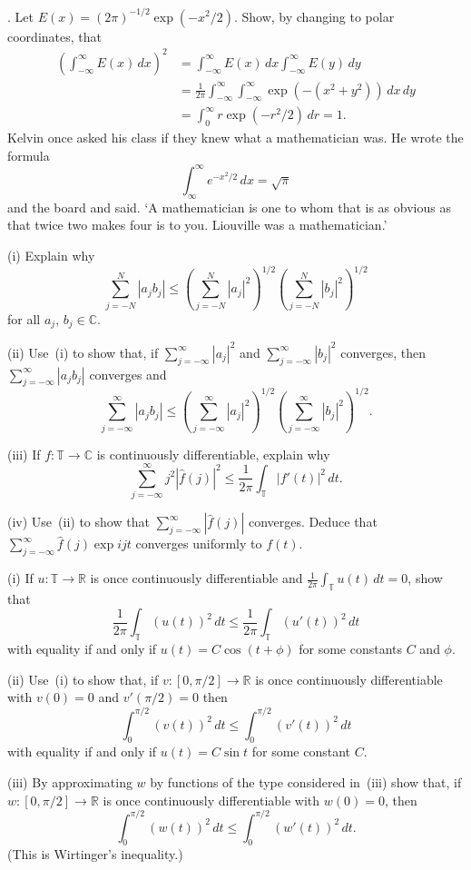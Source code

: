 \begin{question}\label{E, Liouville}.
Let $E(x)=(2\pi)^{-1/2}\exp(-x^{2}/2)$.
Show, by changing to polar coordinates, that
\begin{align*}
\left(\int_{-\infty}^{\infty}E(x)\,dx\right)^{2}
&=\int_{-\infty}^{\infty}E(x)\,dx\int_{-\infty}^{\infty}E(y)\,dy\\
&=\frac{1}{2\pi}\int_{-\infty}^{\infty}\int_{-\infty}^{\infty}
\exp(-(x^{2}+y^{2}))\,dx\,dy\\
&=\int_{0}^{\infty}r\exp(-r^{2}/2)\,dr=1.
\end{align*}
Kelvin once asked his class if they knew what a mathematician was.
He wrote the formula
\[\int_{\infty}^{\infty}e^{-x^{2}/2}\,dx=\sqrt{\pi}\]
and the board and said.
`A mathematician is one to whom that
is as obvious as that twice two makes four is to you.
Liouville was a mathematician.'
\end{question}
\begin{question}\label{E, differentiable everywhere}
(i) Explain why
\[\sum_{j=-N}^{N}|a_{j}b_{j}|\leq
\left(\sum_{j=-N}^{N}|a_{j}|^{2}\right)^{1/2}
\left(\sum_{j=-N}^{N}|b_{j}|^{2}\right)^{1/2}\]
for all $a_{j},\,b_{j}\in{\mathbb C}$.

(ii) Use~(i) to show that, if
$\sum_{j=-\infty}^{\infty}|a_{j}|^{2}$ and
$\sum_{j=-\infty}^{\infty}|b_{j}|^{2}$ converges, then
$\sum_{j=-\infty}^{\infty}|a_{j}b_{j}|$ converges and
\[\sum_{j=-\infty}^{\infty}|a_{j}b_{j}|\leq
\left(\sum_{j=-\infty}^{\infty}|a_{j}|^{2}\right)^{1/2}
\left(\sum_{j=-\infty}^{\infty}|b_{j}|^{2}\right)^{1/2}.\]

(iii) If $f:{\mathbb T}\rightarrow{\mathbb C}$ is continuously
differentiable, explain why
\[\sum_{j=-\infty}^{\infty}j^{2}|\hat{f}(j)|^{2}
\leq \frac{1}{2\pi}\int_{\mathbb T}|f'(t)|^{2}\,dt.\]

(iv) Use~(ii)
to show that $\sum_{j=-\infty}^{\infty}|\hat{f}(j)|$ converges.
Deduce that $\sum_{j=-\infty}^{\infty}\hat{f}(j)\exp ijt$
converges uniformly to $f(t)$.
\end{question}
\begin{question} (i) If $u:{\mathbb T}\rightarrow{\mathbb R}$
is once continuously differentiable and
$\frac{1}{2\pi}\int_{\mathbb T}u(t)\,dt=0$, show that
\[\frac{1}{2\pi}\int_{\mathbb T}(u(t))^{2}\,dt
\leq \frac{1}{2\pi}\int_{\mathbb T}(u'(t))^{2}\,dt\]
with equality if and only if
$u(t)=C\cos(t+\phi)$ for some constants $C$ and $\phi$.

(ii) Use~(i) to show that, if $v:[0,\pi/2]\rightarrow{\mathbb R}$
is once continuously differentiable with $v(0)=0$ and
$v'(\pi/2)=0$ then
\[\int_{0}^{\pi/2}(v(t))^{2}\,dt
\leq  \int_{0}^{\pi/2}(v'(t))^{2}\,dt\]
with equality if and only if
$u(t)=C\sin t$ for some constant $C$.

(iii) By approximating $w$ by functions of the type considered
in~(iii) show that, if $w:[0,\pi/2]\rightarrow{\mathbb R}$
is once continuously differentiable with $w(0)=0$, then
\[\int_{0}^{\pi/2}(w(t))^{2}\,dt
\leq  \int_{0}^{\pi/2}(w'(t))^{2}\,dt.\]
(This is Wirtinger's inequality.)
\end{question}

